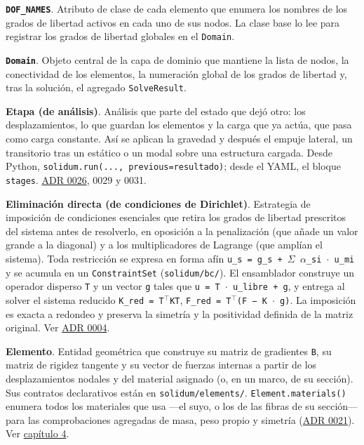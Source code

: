 \documentclass[11pt,oneside]{report}
\begin{document}
\textbf{\texttt{DOF\_NAMES}}. Atributo de clase de cada elemento que enumera los nombres de los grados de libertad activos en cada uno de sus nodos. La clase base lo lee para registrar los grados de libertad globales en el \texttt{Domain}.

\textbf{\texttt{Domain}}. Objeto central de la capa de dominio que mantiene la lista de nodos, la conectividad de los elementos, la numeración global de los grados de libertad y, tras la solución, el agregado \texttt{SolveResult}.

\textbf{Etapa (de análisis)}. Análisis que parte del estado que dejó otro: los desplazamientos, lo que guardan los elementos y la carga que ya actúa, que pasa como carga constante. Así se aplican la gravedad y después el empuje lateral, un transitorio tras un estático o un modal sobre una estructura cargada. Desde Python, \texttt{solidum.\allowbreak{}run(.\allowbreak{}.\allowbreak{}.\allowbreak{}, previous=resultado)}; desde el YAML, el bloque \texttt{stages}. \hyperref[adr:0026]{ADR 0026}, 0029 y 0031.

\textbf{Eliminación directa (de condiciones de Dirichlet)}. Estrategia de imposición de condiciones esenciales que retira los grados de libertad prescritos del sistema antes de resolverlo, en oposición a la penalización (que añade un valor grande a la diagonal) y a los multiplicadores de Lagrange (que amplían el sistema). Toda restricción se expresa en forma afín \texttt{u\_\allowbreak{}s = g\_\allowbreak{}s + \ensuremath{\Sigma} \ensuremath{\alpha}\_\allowbreak{}si \ensuremath{\cdot} u\_\allowbreak{}mi} y se acumula en un \texttt{ConstraintSet} (\texttt{solidum/bc/}). El ensamblador construye un operador disperso \texttt{T} y un vector \texttt{g} tales que \texttt{u = T \ensuremath{\cdot} u\_\allowbreak{}libre + g}, y entrega al solver el sistema reducido \texttt{K\_red = T\ensuremath{^{\top}}KT}, \texttt{F\_\allowbreak{}red = T\ensuremath{^{\top}}(F − K \ensuremath{\cdot} g)}. La imposición es exacta a redondeo y preserva la simetría y la positividad definida de la matriz original. Ver \hyperref[adr:0004]{ADR 0004}.

\textbf{Elemento}. Entidad geométrica que construye su matriz de gradientes \texttt{B}, su matriz de rigidez tangente y su vector de fuerzas internas a partir de los desplazamientos nodales y del material asignado (o, en un marco, de su sección). Sus contratos declarativos están en \texttt{solidum/\allowbreak{}elements/\allowbreak{}}. \texttt{Element.\allowbreak{}materials()} enumera todos los materiales que usa ---el suyo, o los de las fibras de su sección--- para las comprobaciones agregadas de masa, peso propio y simetría (\hyperref[adr:0021]{ADR 0021}). Ver \hyperref[cap:4]{capítulo 4}.
\end{document}
